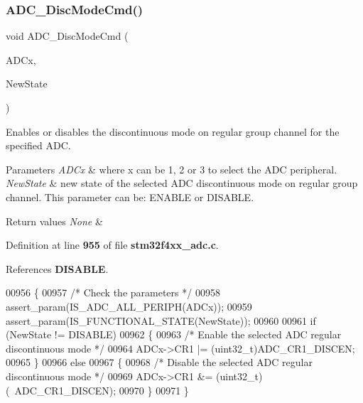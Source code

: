 \subsubsection{A\+D\+C\+\_\+\+Disc\+Mode\+Cmd()}
{\footnotesize\ttfamily void A\+D\+C\+\_\+\+Disc\+Mode\+Cmd (\begin{DoxyParamCaption}\item[{\textbf{ A\+D\+C\+\_\+\+Type\+Def} $\ast$}]{A\+D\+Cx,  }\item[{\textbf{ Functional\+State}}]{New\+State }\end{DoxyParamCaption})}



Enables or disables the discontinuous mode on regular group channel for the specified A\+DC. 


\begin{DoxyParams}{Parameters}
{\em A\+D\+Cx} & where x can be 1, 2 or 3 to select the A\+DC peripheral. \\
\hline
{\em New\+State} & new state of the selected A\+DC discontinuous mode on regular group channel. This parameter can be\+: E\+N\+A\+B\+LE or D\+I\+S\+A\+B\+LE. \\
\hline
\end{DoxyParams}

\begin{DoxyRetVals}{Return values}
{\em None} & \\
\hline
\end{DoxyRetVals}


Definition at line \textbf{ 955} of file \textbf{ stm32f4xx\+\_\+adc.\+c}.



References \textbf{ D\+I\+S\+A\+B\+LE}.


\begin{DoxyCode}
00956 \{
00957   \textcolor{comment}{/* Check the parameters */}
00958   assert_param(IS_ADC_ALL_PERIPH(ADCx));
00959   assert_param(IS_FUNCTIONAL_STATE(NewState));
00960   
00961   \textcolor{keywordflow}{if} (NewState != DISABLE)
00962   \{
00963     \textcolor{comment}{/* Enable the selected ADC regular discontinuous mode */}
00964     ADCx->CR1 |= (uint32\_t)ADC_CR1_DISCEN;
00965   \}
00966   \textcolor{keywordflow}{else}
00967   \{
00968     \textcolor{comment}{/* Disable the selected ADC regular discontinuous mode */}
00969     ADCx->CR1 &= (uint32\_t)(~ADC_CR1_DISCEN);
00970   \}
00971 \}
\end{DoxyCode}
\mbox{\label{group__ADC__Group4_ga5316caaa170415ef171c486d8f0bf22d}} 
